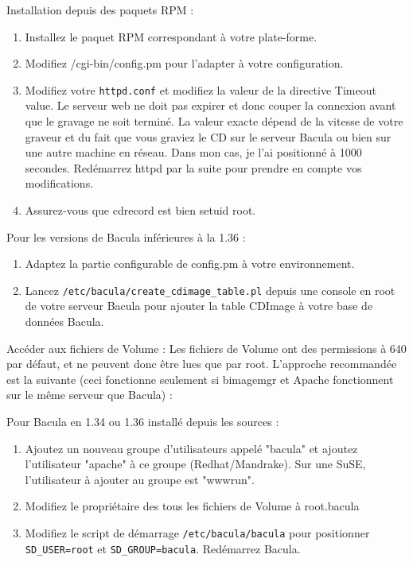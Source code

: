 Installation depuis des paquets RPM :
\begin{enumerate}
\item Installez le paquet RPM correspondant à votre plate-forme.
\item Modifiez /cgi-bin/config.pm pour l'adapter à votre configuration.
\item Modifiez votre \texttt{httpd.conf} et modifiez la valeur de la directive
    Timeout value. Le serveur web ne doit pas expirer et donc couper la 
    connexion avant que le gravage ne soit terminé. La valeur exacte dépend de
    la vitesse de votre graveur et du fait que vous graviez le CD sur le serveur
    Bacula ou bien sur une autre machine en réseau. Dans mon cas, je l'ai 
    positionné à 1000 secondes. Redémarrez httpd par la suite pour prendre en
    compte vos modifications.
\item Assurez-vous que cdrecord est bien setuid root.
\end{enumerate}

Pour les versions de Bacula inférieures à la 1.36 :
\begin{enumerate}
\item Adaptez la partie configurable de config.pm à votre environnement.
\item Lancez \texttt{/etc/bacula/create\_cdimage\_table.pl} depuis une console
    en root de votre serveur Bacula pour ajouter la table CDImage à votre base
    de données Bacula.
\end{enumerate}

Accéder aux fichiers de Volume :
Les fichiers de Volume ont des permissions à 640 par défaut, et ne peuvent donc
être lues que par root. L'approche recommandée est la suivante (ceci fonctionne
seulement si bimagemgr et Apache fonctionnent sur le même serveur que Bacula) :

Pour Bacula en 1.34 ou 1.36 installé depuis les sources :
\begin{enumerate}
\item Ajoutez un nouveau groupe d'utilisateurs appelé "bacula" et ajoutez
    l'utilisateur "apache" à ce groupe (Redhat/Mandrake). Sur une SuSE,
    l'utilisateur à ajouter au groupe est "wwwrun".
\item Modifiez le propriétaire des tous les fichiers de Volume à root.bacula
\item Modifiez le script de démarrage \texttt{/etc/bacula/bacula} pour 
    positionner \texttt{SD\_USER=root} et \texttt{SD\_GROUP=bacula}. Redémarrez 
    Bacula.
\end{enumerate}

